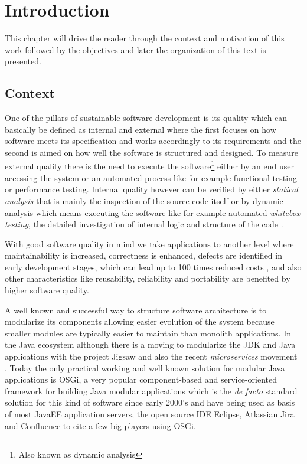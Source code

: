 \chapter{Introduction}
 This chapter will drive the reader through the context and motivation of this work followed by the objectives and later the organization of this text is presented.  
 

\section{Context}

One of the pillars of sustainable software development is its quality which can basically be defined as internal and external where the first focuses on how software meets its specification and works accordingly to its requirements and the second is aimed on how well the software is structured and designed. To measure external quality there is the need to execute the software\footnote{Also known as dynamic analysis} either by an end user accessing the system or an automated process like for example functional testing or performance testing. Internal quality however can be verified by either \emph{statical analysis} that is mainly the inspection of the source code itself or by dynamic analysis which means executing the software like for example automated \emph{whitebox testing}, the detailed investigation of internal logic and structure of the code \citep{Khan 2012}.   

With good software quality in mind we take applications to another level where maintainability is increased, correctness is enhanced, defects are identified in early development stages, which can lead up to 100 times reduced costs \citep{Beohm 2001}, and also other characteristics like reusability, reliability and portability are benefited by higher software quality.  

A well known and successful way to structure software architecture is to modularize its components allowing easier evolution of the system because smaller modules are typically easier to maintain than monolith applications. In the Java ecosystem although there is a moving to modularize the JDK and Java applications with the project Jigsaw \citep{Krill 2012} and also the recent \emph{microservices} movement \citep{Knorr 2014}. Today the only practical working and well known solution for modular Java applications is OSGi, a very popular component-based and service-oriented framework for building Java modular applications which is the \emph{de facto} standard solution for this kind of software since early 2000's and have being used as basis of most JavaEE application servers, the open source IDE Eclipse, Atlassian Jira and Confluence to cite a few big players using OSGi. 

